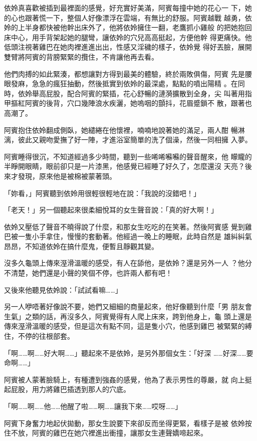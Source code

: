依姈真喜歡被插到最裡面的感覺，好充實好美滿，阿賓每撞中她的花心一
下，她的心也跟著慌一下，整個人好像漂浮在雲端，有無比的舒服。阿賓越戰
越勇，依姈的上半身都快被他幹出床外了，他將依姈擁住一翻，老鷹抓小雞般
的把她抱回床中心，用手背架起她的腿彎，讓依姈的穴兒高高挺起，方便他幹
得更痛快。他低頭注視著雞巴在她肉裡進進出出，性感又淫穢的樣子，依姈覺
得好丟臉，展開雙臂將阿賓的背膀緊緊的攬住，不肯讓他再去看。

他們肉搏的如此緊湊，都想讓對方得到最美的體驗，終於兩敗俱傷，阿賓
先是腰眼發麻，急急的瘋狂抽動，然後抵實到依姈的最深處，點點的噴出陽精
。在同時，依姈舉高屁股，配合阿賓的緊插，花心舒暢的漣漪擴散到全身，尖
叫著用指甲摳紅阿賓的後背，穴口幾陣浪水疾灑，她嗚咽的顫抖，花眉蹙鎖不
散，跟著也高潮了。

阿賓抱住依姈翻成側臥，她繾綣在他懷裡，喃喃地說著她的滿足，兩人酣
暢淋漓，彼此又親吻愛撫了好一陣，才進浴室簡單的洗了個澡，然後一同相擁
入夢。

阿賓睡得很沉，不知道經過多少時間，聽到一些唏唏囌囌的聲音醒來，他
矇矓的半睜開眼睛，眼前卻只是一片漆黑，他感覺已經睡了好久了，怎麼還沒
天亮？後來才發現，原來他是被棉被蒙著頭。

「妳看，」阿賓聽到依姈用很輕很輕地在說：「我說的沒錯吧！」

「老天！」另一個聽起來很柔細悅耳的女生聲音說：「真的好大啊！」

依姈又壓低了聲音不曉得說了什麼，和那女生吃吃的在笑著。然後阿賓感
覺到雞巴被一隻小手拿住，慢慢的套動著。他經過一晚上的睡眠，此時自然是
雄糾糾氣昂昂，不知道依姈在搞什麼鬼，便暫且靜觀其變。

沒多久龜頭上傳來溼滑溫暖的感受，有人在舔他，是依姈？還是另外一人
？他分不清楚，她們還是小聲的笑個不停，也許兩人都有吧！

又後來他聽見依姈說：「試試看嘛……」

另一人咿唔著好像說不要，她們又細細的商量起來，他好像聽到什麼「男
朋友會生氣」之類的話，再沒多久，阿賓覺得有人爬上床來，跨到他身上，龜
頭上還是傳來溼滑溫暖的感受，但是這次有點不同，這是隻小穴，他感到雞巴
被緊緊的縛住，不停的往根部套。

「啊……啊……好大啊……」聽起來不是依姈，是另外那個女生：「好深
……好深……要命啊……」

阿賓被人蒙著臉騎上，有種遭到強姦的感覺，他為了表示男性的尊嚴，就
向上挺起屁股，用力將雞巴插透到那人的穴底。

「啊……啊……他……他醒了啦……啊……讓我下來……哎呀……」

阿賓下身奮力地起伏拋動，那女生說要下來卻反而坐得更緊，看樣子是被
依姈按住不放，阿賓的雞巴在她穴裡進出衝撞，讓那女生連聲嬌啼起來。

